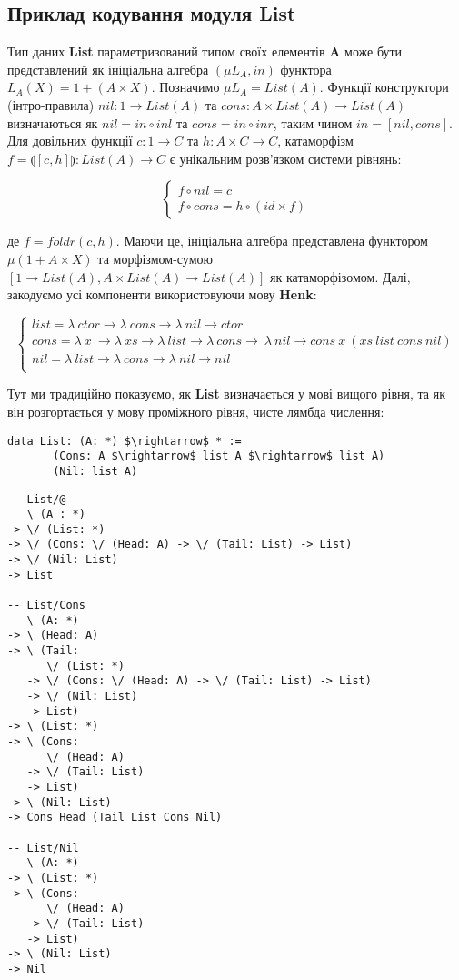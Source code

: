 \documentclass{article}
\begin{document}
\subsection{Приклад кодування модуля List}
Тип даних \textbf{List} параметризований типом своїх елементів \textbf{A} може бути представлений як
ініціальна алгебра $(\mu L_A, in)$ функтора $L_A(X) = 1 + (A \times X)$. Позначимо $\mu L_A = List(A)$.
Функції конструктори (інтро-правила) $nil: 1 \rightarrow List(A)$ та
$cons: A \times List(A) \rightarrow List(A)$ визначаються як
$nil = in \circ inl$ та $cons = in \circ inr$, таким чином $in = [nil,cons]$.
Для довільних функції $c: 1 \rightarrow C$ та $h: A \times C \rightarrow C$,
катаморфізм $f = \llparenthesis [c,h] \rrparenthesis : List(A) \rightarrow C$
є унікальним розв'язком системи рівнянь:

$$
\begin{cases}
  f \circ nil  = c \\
  f \circ cons = h \circ (id \times f)
\end{cases}
$$

де $f = foldr(c,h)$. Маючи це, ініціальна алгебра представлена функтором
$\mu (1 + A \times X)$ та морфізмом-сумою $[1 \rightarrow List(A), A \times List(A) \rightarrow List(A)]$
як катаморфізомом. Далі, закодуємо усі компоненти використовуючи мову \textbf{Henk}:

$$
\begin{cases}
list = \lambda\ ctor \rightarrow \lambda\ cons \rightarrow \lambda\ nil \rightarrow ctor\\
cons = \lambda\ x\ \rightarrow \lambda\ xs \rightarrow \lambda\ list \rightarrow \lambda\ cons \rightarrow\ \lambda\ nil \rightarrow cons\ x\ (xs\ list\ cons\ nil)\\
nil = \lambda\ list \rightarrow \lambda\ cons \rightarrow \lambda\ nil \rightarrow nil\\
\end{cases}
$$

Тут ми традиційно показуємо, як {\bf List} визначається у мові вищого рівня,
та як він розгортається у мову проміжного рівня, чисте лямбда числення:

\begin{lstlisting}[mathescape=true]
  data List: (A: *) $\rightarrow$ * :=
       (Cons: A $\rightarrow$ list A $\rightarrow$ list A)
       (Nil: list A)
\end{lstlisting}

\begin{lstlisting}[mathescape=true]
-- List/@
   \ (A : *)
-> \/ (List: *)
-> \/ (Cons: \/ (Head: A) -> \/ (Tail: List) -> List)
-> \/ (Nil: List)
-> List

-- List/Cons
   \ (A: *)
-> \ (Head: A)
-> \ (Tail:
      \/ (List: *)
   -> \/ (Cons: \/ (Head: A) -> \/ (Tail: List) -> List)
   -> \/ (Nil: List)
   -> List)
-> \ (List: *)
-> \ (Cons:
      \/ (Head: A)
   -> \/ (Tail: List)
   -> List)
-> \ (Nil: List)
-> Cons Head (Tail List Cons Nil)

-- List/Nil
   \ (A: *)
-> \ (List: *)
-> \ (Cons:
      \/ (Head: A)
   -> \/ (Tail: List)
   -> List)
-> \ (Nil: List)
-> Nil
\end{lstlisting}
\end{document}
